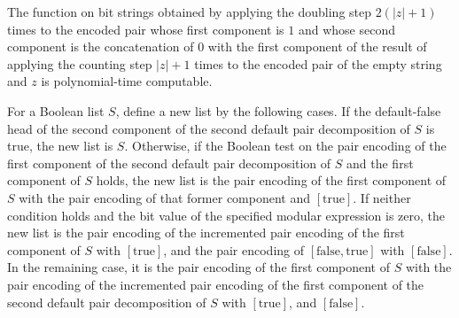 \begin{theorem}
\label{Complexity.BinArith.polyTimeComputable_dblLoop}
\leanok
{}
The function on bit strings obtained by applying the doubling step $2(|z|+1)$ times to
the encoded pair whose first component is $1$ and whose second component is the
concatenation of $0$ with the first component of the result of applying the counting
step $|z|+1$ times to the encoded pair of the empty string and $z$ is polynomial-time
computable.
\end{theorem}

\begin{definition}
\label{Complexity.BinArith.searchStep}
\leanok
{}
For a Boolean list $S$, define a new list by the following cases. If the default-false
head of the second component of the second default pair decomposition of $S$ is true,
the new list is $S$. Otherwise, if the Boolean test on the pair encoding of the first
component of the second default pair decomposition of $S$ and the first component of $S$
holds, the new list is the pair encoding of the first component of $S$ with the pair
encoding of that former component and $[\mathrm{true}]$. If neither condition holds and
the bit value of the specified modular expression is zero, the new list is the pair
encoding of the incremented pair encoding of the first component of $S$ with
$[\mathrm{true}]$, and the pair encoding of $[\mathrm{false},\mathrm{true}]$ with
$[\mathrm{false}]$. In the remaining case, it is the pair encoding of the first
component of $S$ with the pair encoding of the incremented pair encoding of the first
component of the second default pair decomposition of $S$ with $[\mathrm{true}]$, and
$[\mathrm{false}]$.
\end{definition}

